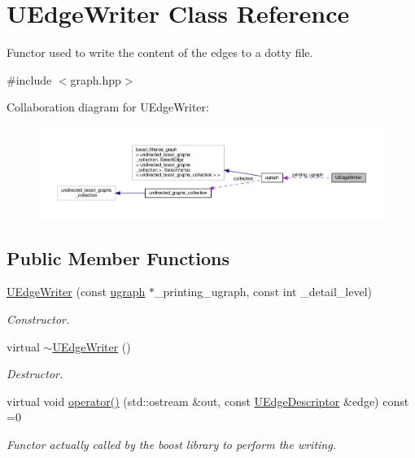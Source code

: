 \hypertarget{classUEdgeWriter}{}\section{U\+Edge\+Writer Class Reference}
\label{classUEdgeWriter}


Functor used to write the content of the edges to a dotty file.  




{\ttfamily \#include $<$graph.\+hpp$>$}



Collaboration diagram for U\+Edge\+Writer\+:
\nopagebreak
\begin{figure}[H]
\begin{center}
\leavevmode
\includegraphics[width=350pt]{d5/d48/classUEdgeWriter__coll__graph}
\end{center}
\end{figure}
\subsection*{Public Member Functions}
\begin{DoxyCompactItemize}
\item 
\hyperlink{classUEdgeWriter_a9fa7b65468e27e7f6335ec966f4f8fc9}{U\+Edge\+Writer} (const \hyperlink{structugraph}{ugraph} $\ast$\+\_\+printing\+\_\+ugraph, const int \+\_\+detail\+\_\+level)
\begin{DoxyCompactList}\small\item\em Constructor. \end{DoxyCompactList}\item 
virtual \hyperlink{classUEdgeWriter_adb9f1bfaaf9450c36be84d2b2479e28b}{$\sim$\+U\+Edge\+Writer} ()
\begin{DoxyCompactList}\small\item\em Destructor. \end{DoxyCompactList}\item 
virtual void \hyperlink{classUEdgeWriter_af58c69e0a206bae565f61ee95b2fcc07}{operator()} (std\+::ostream \&out, const \hyperlink{graph_8hpp_a2b4fd9c6560ff0335716f4bdbd932aba}{U\+Edge\+Descriptor} \&edge) const =0
\begin{DoxyCompactList}\small\item\em Functor actually called by the boost library to perform the writing. \end{DoxyCompactList}\end{DoxyCompactItemize}
